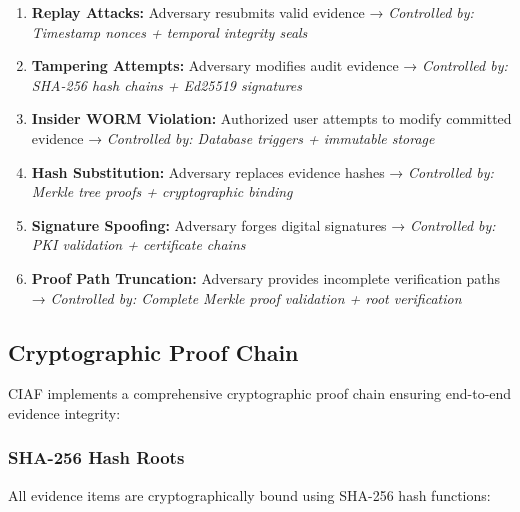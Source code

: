 \documentclass[12pt,a4paper]{article}
\begin{document}
\begin{enumerate}
\item \textbf{Replay Attacks:} Adversary resubmits valid evidence → \textit{Controlled by: Timestamp nonces + temporal integrity seals}
\item \textbf{Tampering Attempts:} Adversary modifies audit evidence → \textit{Controlled by: SHA-256 hash chains + Ed25519 signatures}
\item \textbf{Insider WORM Violation:} Authorized user attempts to modify committed evidence → \textit{Controlled by: Database triggers + immutable storage}
\item \textbf{Hash Substitution:} Adversary replaces evidence hashes → \textit{Controlled by: Merkle tree proofs + cryptographic binding}
\item \textbf{Signature Spoofing:} Adversary forges digital signatures → \textit{Controlled by: PKI validation + certificate chains}
\item \textbf{Proof Path Truncation:} Adversary provides incomplete verification paths → \textit{Controlled by: Complete Merkle proof validation + root verification}
\end{enumerate}

\subsection{Cryptographic Proof Chain}

CIAF implements a comprehensive cryptographic proof chain ensuring end-to-end evidence integrity:

\subsubsection{SHA-256 Hash Roots}

All evidence items are cryptographically bound using SHA-256 hash functions:
\end{document}

